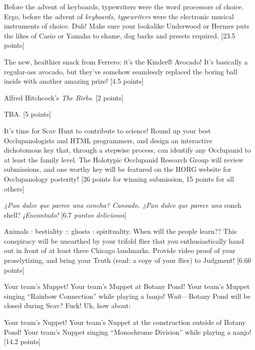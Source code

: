 \documentclass{book}
\begin{document}
\begin{list}{}{}
\item Before the advent of keyboards, typewriters were the word processors of choice. Ergo, before the advent of \textit{keyboards, typewriters} were the electronic musical instruments of choice. Duh! Make sure your lookalike Underwood or Hermes puts the likes of Casio or Yamaha to shame, dog barks and presets required. [23.5 points]
\item The new, healthier snack from Ferrero: it’s the Kinder® Avocado! It’s basically a regular-ass avocado, but they’ve somehow seamlessly replaced the boring ball inside with another amazing prize! [4.5 points]
\item Alfred Hitchcock's \textit{The Birbs}. [2 points]
\item TBA. [5 points] %
\item It’s time for Scav Hunt to contribute to science! Round up your best Occlupanologists and HTML programmers, and design an interactive dichotomous key that, through a stepwise process, can identify any Occlupanid to at least the family level. The Holotypic Occlupanid Research Group will review submissions, and one worthy key will be featured on the HORG website for Occlupanology posterity! [26 points for winning submission, 15 points for all others]
\item \textit{¿Pan dulce que parece una concha? Cansado. ¿Pan dulce que parece una} conch shell? \textit{¡Encantado!} [6.7 \textit{puntos deliciosos}]
\item Animals : bestiality :: ghosts : spirituality. When will the people learn?? This conspiracy will be unearthed by your trifold flier that you enthusiastically hand out in front of at least three Chicago landmarks. Provide video proof of your proselytizing, and bring your Truth (read: a copy of your flier) to Judgment! [6.66 points] \textleaf
\item Your team’s Muppet! Your team’s Muppet at Botany Pond! Your team’s Muppet singing “Rainbow Connection” while playing a banjo! Wait---Botany Pond will be closed during Scav? Fuck! Uh, how about:

 Your team’s Nuppet! Your team’s Nuppet at the construction outside of Botany Pond! Your team’s Nuppet singing “Monochrome Division” while playing a nanjo! [14.2 points] \textleaf


\end{list}
\end{document}
